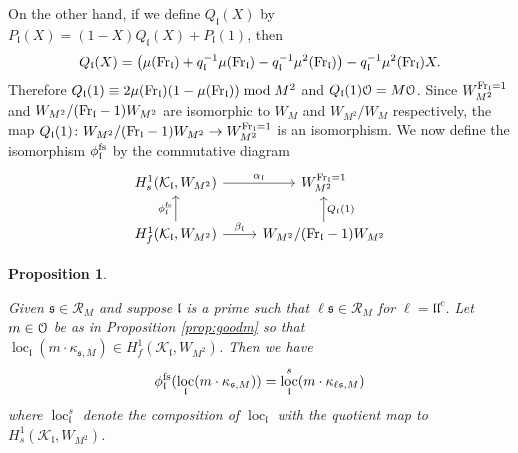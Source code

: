 \documentclass[leqno]{amsart}
\newtheorem{prop}[thm]{Proposition}
\theoremstyle{definition}
\theoremstyle{remark}
\newcommand{\eo}{\EuScript{O}}
\newcommand{\Fr}{\textnormal{Fr}} %
\newcommand{\fl}{\mathfrak{l}}
\newcommand{\fs}{\mathfrak{s}}
\newcommand{\K}{{\mathcal{K}}} %
\DeclareMathOperator{\loc}{loc}
\begin{document}
On the other hand,
if we define $Q_\fl(X)$ by
$P_\fl(X)=(1-X)Q_\fl(X)+P_\fl(1)$, then
\[
Q_\fl(X)=\big(\mu(\Fr_\fl)+q_\fl^{-1}\mu(\Fr_\fl)-q_\fl^{-1}\mu^2(\Fr_\fl)\big)-
q_\fl^{-1}\mu^2(\Fr_\fl)X.
\]
Therefore $Q_\fl(1)\equiv 2\mu(\Fr_\fl)(1-\mu(\Fr_\fl))\bmod M^2$
and $Q_\fl(1)\eo=M\eo$.
Since $W_{M^2}^{\Fr_\fl=1}$ and $W_{M^2}/(\Fr_\fl-1)W_{M^2}$ 
are isomorphic to $W_M$ and $W_{M^2}/W_M$
respectively, the map
$Q_\fl(1)\colon W_{M^2}/(\Fr_\fl-1)W_{M^2}\to W_{M^2}^{\Fr_\fl=1}$
is an isomorphism. 
We now define the isomorphism
$\phi_\fl^{\textnormal{fs}}$ by the commutative diagram
\begin{equation}\label{def:finite_singular}
	\begin{tikzcd}
		H^1_s(\K_\fl, W_{M^2}) \arrow[r,"\alpha_\fl"]&
		W_{M^2}^{\Fr_\fl=1} \\
		H^1_{f}(\K_\fl, W_{M^2}) \arrow[r,"\beta_\fl"]
		\arrow[u,"\phi_\fl^{\textnormal{fs}}"]&
		W_{M^2}/(\Fr_\fl-1)W_{M^2}
		\arrow[u,"Q_\fl(1)",swap]
	\end{tikzcd}
\end{equation}


\begin{prop}\label{prop:fscomparison}

Given $\fs\in\mathcal{R}_M$
and suppose $\fl$ is a prime such that 
$\ell\fs\in\mathcal{R}_M$ for $\ell=\fl\fl^c$.
Let $m\in \eo$ be as in Proposition \ref{prop:goodm}
so that $\loc_\fl(m\cdot \kappa_{\fs,M})\in H^1_f(\K_\fl, W_{M^2})$.
Then we have  
\[
\phi_\fl^{\textnormal{fs}}(\loc_{\fl}(m\cdot \kappa_{\fs,M}))=
\loc^s_\fl(m\cdot \kappa_{\ell\fs,M})
\]
where $\loc_\fl^s$ denote the composition of $\loc_\fl$
with the quotient map to $H^1_s(\K_\fl,W_{M^2})$.

\end{prop}
\end{document}
